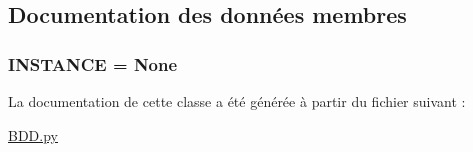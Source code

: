 \subsection{Documentation des données membres}
\hypertarget{classBDD_1_1BDD_acdc4eb469ce81b047ec0acf8bfaa6e22}{
\subsubsection[{I\-N\-S\-T\-A\-N\-C\-E}]{\setlength{\rightskip}{0pt plus 5cm}I\-N\-S\-T\-A\-N\-C\-E = None\hspace{0.3cm}{\ttfamily [static]}}}\label{classBDD_1_1BDD_acdc4eb469ce81b047ec0acf8bfaa6e22}


La documentation de cette classe a été générée à partir du fichier suivant \-:\begin{DoxyCompactItemize}
\item 
\hyperlink{BDD_8py}{B\-D\-D.\-py}\end{DoxyCompactItemize}
